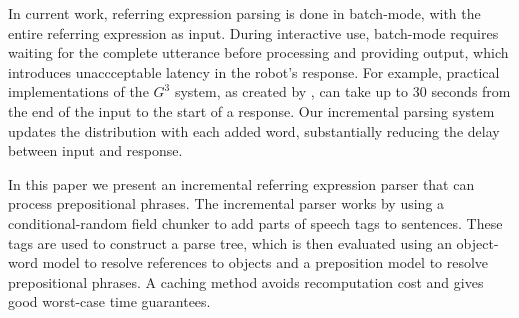 \documentclass[conference]{IEEEtran}
\numberwithin{equation}{section}
\begin{document}
In current work, referring expression parsing is done in batch-mode, with the entire referring expression as input. \citep{tellex2011understanding,UW_RSE_ICML2012,artzi2013weakly,fang2015embodied} During interactive use, batch-mode requires waiting for the complete utterance before processing and providing output, which introduces unaccceptable latency in the robot's response. For example, practical implementations of the $G^3$ system, as created by \citet{tellex2011understanding}, can take up to 30 seconds from the end of the input to the start of a response. Our incremental parsing system updates the distribution with each added word, substantially reducing the delay between input and response.

In this paper we present an incremental referring expression parser that can process prepositional phrases. The incremental parser works by using a conditional-random field chunker to add parts of speech tags to sentences. These tags are used to construct a parse tree, which is then evaluated using an object-word model to resolve references to objects and a preposition model to resolve prepositional phrases. A caching method avoids recomputation cost and gives good worst-case time guarantees.
\end{document}
